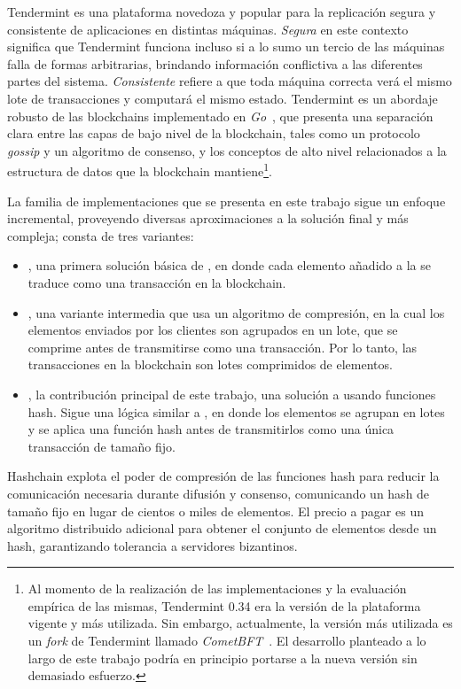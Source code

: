 

Tendermint es una plataforma novedoza y popular para la
replicación segura y consistente de aplicaciones en distintas máquinas.
%
\textit{Segura} en este contexto significa que Tendermint funciona incluso si a lo sumo
un tercio de las máquinas falla de formas arbitrarias, brindando información conflictiva
a las diferentes partes del sistema.
%
\textit{Consistente} refiere a que toda máquina correcta verá el mismo lote de
transacciones y computará el mismo estado.
%
Tendermint es un abordaje robusto de las blockchains implementado
en \emph{Go}~\cite{donovan15go}, que presenta una separación clara entre las
capas de bajo nivel de la blockchain,
tales como un protocolo \textit{gossip} y un algoritmo de consenso, y los conceptos de alto
nivel relacionados a la estructura de datos que la blockchain mantiene\footnote{Al momento
de la realización de las implementaciones y la evaluación empírica de las mismas,
Tendermint 0.34 era la versión de la plataforma vigente y más utilizada. Sin embargo,
actualmente, la versión más utilizada es un \textit{fork} de Tendermint llamado \textit{CometBFT}~\cite{cometbft.repo}.
El desarrollo planteado a lo largo de este trabajo podría en principio portarse a la nueva versión sin demasiado esfuerzo.}.

%
%

La familia de implementaciones que se presenta en este trabajo
sigue un enfoque incremental, proveyendo diversas aproximaciones
a la solución final y más compleja; consta de tres variantes:
\begin{itemize}
  \item \textit{\vanilla}, una primera solución básica de \setchain, en donde cada elemento añadido
  a la \setchain se traduce como una transacción en la blockchain.
  \item \textit{\compresschain}, una variante intermedia que usa un algoritmo de compresión,
  en la cual los elementos enviados por los clientes son agrupados en un lote, que se comprime antes
  de transmitirse como una transacción. Por lo tanto, las transacciones en la blockchain son
  lotes comprimidos de elementos.
  \item \textit{\hashchain}, la contribución principal de este trabajo, una solución 
  a \setchain usando funciones hash. Sigue una lógica similar a \compresschain,
  en donde los elementos se agrupan en lotes y se aplica una función hash antes de transmitirlos
  como una única transacción de tamaño fijo.
\end{itemize}
%
Hashchain explota el poder de compresión de las funciones hash para reducir la
comunicación necesaria durante difusión y consenso, comunicando un hash de tamaño
fijo en lugar de cientos o miles de elementos.
%
El precio a pagar es un algoritmo distribuido adicional para obtener el conjunto de
elementos desde un hash, garantizando tolerancia a servidores bizantinos.
%

